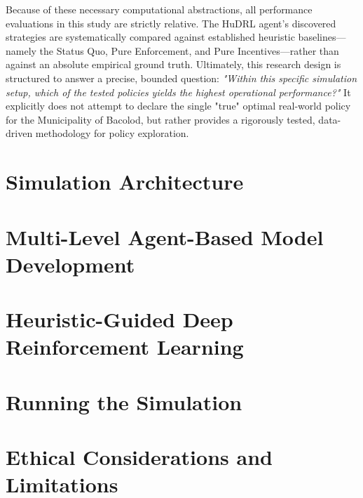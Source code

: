 Because of these necessary computational abstractions, all performance evaluations in this study are strictly relative. The HuDRL agent's discovered strategies are systematically compared against established heuristic baselines—namely the Status Quo, Pure Enforcement, and Pure Incentives—rather than against an absolute empirical ground truth. Ultimately, this research design is structured to answer a precise, bounded question: \textit{"Within this specific simulation setup, which of the tested policies yields the highest operational performance?"} It explicitly does not attempt to declare the single "true" optimal real-world policy for the Municipality of Bacolod, but rather provides a rigorously tested, data-driven methodology for policy exploration.

\section{Simulation Architecture}


\newpage
\section{Multi-Level Agent-Based Model Development}


\section{Heuristic-Guided Deep Reinforcement Learning}


\newpage
\section{Running the Simulation}


\section{Ethical Considerations and Limitations}

